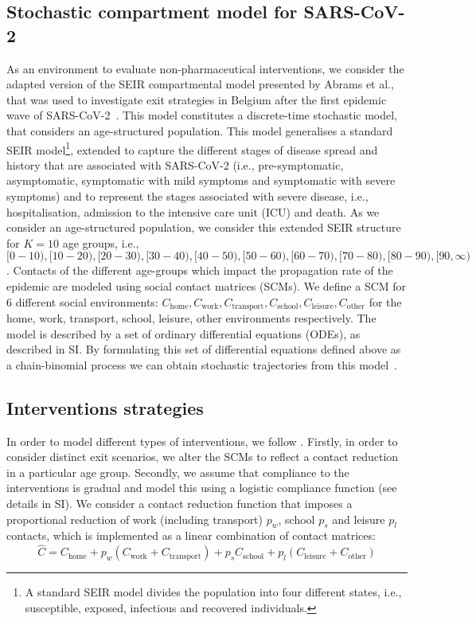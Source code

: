 \documentclass{article}
\renewcommand{\cite}[1]{\citep{#1}}
\newcommand{\chome}{C_{\text{home}}}
\newcommand{\cwork}{C_{\text{work}}}
\newcommand{\ctransport}{C_{\text{transport}}}
\newcommand{\cschool}{C_{\text{school}}}
\newcommand{\cleisure}{C_{\text{leisure}}}
\newcommand{\cother}{C_{\text{other}}}
\newcommand{\agegroups}{K}
\begin{document}
\subsection{Stochastic compartment model for SARS-CoV-2}
\label{sec:sars-cov2-momdp_model}
As an environment to evaluate non-pharmaceutical interventions, we consider the adapted version of the SEIR compartmental model presented by Abrams et al., that was used to investigate exit strategies in Belgium after the first epidemic wave of SARS-CoV-2~\cite{abrams2021modelling}. This model constitutes a discrete-time stochastic model, that considers an age-structured population. This model generalises a standard SEIR model\footnote{A standard SEIR model divides the population into four different states, i.e., susceptible, exposed, infectious and recovered individuals.}, extended to capture the different stages of disease spread and history that are associated with SARS-CoV-2 (i.e., pre-symptomatic, asymptomatic, symptomatic with mild symptoms and symptomatic with severe symptoms) and to represent the stages associated with severe disease, i.e., hospitalisation, admission to the intensive care unit (ICU) and death. 
As we consider an age-structured population, we consider this extended SEIR structure for $\agegroups = 10$ age groups,  i.e., $[0-10), [10-20), [20-30), [30-40), [40-50), [50-60), [60-70), [70-80), [80-90), [90,\infty)$. Contacts of the different age-groups which impact the propagation rate of the epidemic are modeled using social contact matrices (SCMs). We define a SCM for 6 different social environments: $\chome, \cwork, \ctransport, \cschool, \cleisure, \cother$ for the home, work, transport, school, leisure, other environments respectively.
The model is described by a set of ordinary differential equations (ODEs), as described in SI.
By formulating this set of differential equations defined above as a chain-binomial process we can obtain stochastic trajectories from this model~\cite{abrams2021modelling}.

\subsection{Interventions strategies}
\label{sec:interventions}
In order to model different types of interventions, we follow \citet{abrams2021modelling}. Firstly, in order to consider distinct exit scenarios, we alter the SCMs to reflect a contact reduction in a particular age group. Secondly, we assume that compliance to the interventions is gradual and model this using a logistic compliance function (see details in SI).
We consider a contact reduction function that imposes a proportional reduction of work (including transport) $p_w$, school $p_s$ and leisure $p_l$ contacts, which is implemented as a linear combination of contact matrices:
\begin{equation}
\label{eq:scm}
    \hat{C} = \chome + p_w (\cwork + \ctransport) + p_s \cschool + p_l (\cleisure + \cother)
\end{equation}
\end{document}
